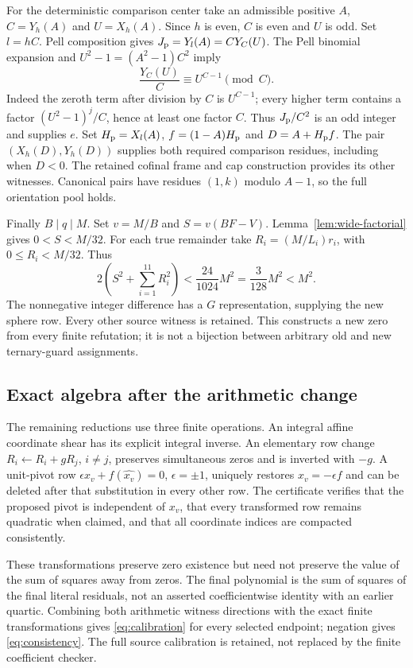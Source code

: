 For the deterministic comparison center take an admissible positive $A$,
$C=Y_h(A)$ and $U=X_h(A)$. Since $h$ is even, $C$ is even and $U$ is
odd. Set $l=hC$. Pell composition gives $J_{\rm p}=Y_l(A)=CY_C(U)$.
The Pell binomial expansion and $U^2-1=(A^2-1)C^2$ imply
\[
 \frac{Y_C(U)}C\equiv U^{C-1}\pmod C.
\]
Indeed the zeroth term after division by $C$ is $U^{C-1}$; every
higher term contains a factor $(U^2-1)^j/C$, hence at least one
factor $C$. Thus $J_{\rm p}/C^2$ is an odd integer and supplies $e$.
Set $H_{\rm p}=X_l(A)$, $f=(1-A)H_{\rm p}$ and
$D=A+H_{\rm p}f$. The pair $(X_h(D),Y_h(D))$ supplies both required
comparison residues, including when $D<0$. The retained cofinal frame
and cap construction provides its other witnesses. Canonical pairs have
residues $(1,k)$ modulo $A-1$, so the full orientation pool holds.

Finally $B\mid q\mid M$. Set $v=M/B$ and $S=v(BF-V)$.
Lemma~\ref{lem:wide-factorial} gives $0<S<M/32$.
For each true remainder take $R_i=(M/L_i)r_i$, with
$0\le R_i<M/32$. Thus
\[
 2\left(S^2+\sum_{i=1}^{11}R_i^2\right)
       <\frac{24}{1024}M^2=\frac3{128}M^2<M^2.
\]
The nonnegative integer difference has a $G$ representation, supplying
the new sphere row. Every other source witness is retained.
This constructs a new zero from every finite refutation; it is not a
bijection between arbitrary old and new ternary-guard assignments.

\subsection{Exact algebra after the arithmetic change}
The remaining reductions use three finite operations. An integral affine
coordinate shear has its explicit integral inverse. An elementary row
change $R_i\leftarrow R_i+gR_j$, $i\ne j$, preserves simultaneous zeros
and is inverted with $-g$. A unit-pivot row
$\epsilon x_v+f(\widehat{x_v})=0$, $\epsilon=\pm1$, uniquely restores
$x_v=-\epsilon f$ and can be deleted after that substitution in every
other row. The certificate verifies that the proposed pivot is independent
of $x_v$, that every transformed row remains quadratic when claimed,
and that all coordinate indices are compacted consistently.

These transformations preserve zero existence but need not preserve the
value of the sum of squares away from zeros. The final polynomial is the
sum of squares of the final literal residuals, not an asserted
coefficientwise identity with an earlier quartic. Combining both arithmetic
witness directions with the exact finite transformations gives
\eqref{eq:calibration} for every selected endpoint; negation gives
\eqref{eq:consistency}. The full source calibration is retained, not
replaced by the finite coefficient checker.
